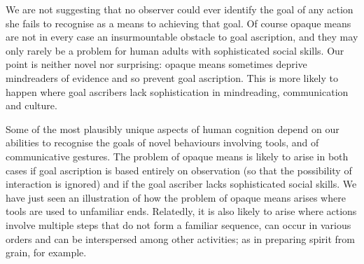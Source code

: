 \documentclass[12pt,\papersize]{extarticle}
\begin{document}
We are not suggesting that no observer could ever identify the goal of any action she fails to recognise as a means to achieving that goal.
Of course opaque means are not in every case an insurmountable obstacle to goal ascription, and
they may only rarely be a problem for human adults with sophisticated social skills.
Our point is neither novel nor surprising:
opaque means sometimes  deprive mindreaders of evidence and so prevent goal ascription.
This is more likely to happen where  goal ascribers lack sophistication in mindreading, communication and culture.

Some of the most plausibly unique aspects of human cognition depend on our abilities to recognise the goals of novel behaviours involving tools, and of communicative gestures.
The problem of opaque means is likely to arise in both cases
if goal ascription is based  entirely on observation 
(so that the possibility of interaction is ignored)
and if the goal ascriber lacks sophisticated social skills.
We have just seen an illustration of how the problem of opaque means arises where tools are used to unfamiliar ends.
Relatedly, it is also likely to arise where actions involve multiple steps that do not form a familiar sequence, can occur in various orders and can be interspersed among other activities;
as in preparing spirit from grain, for example.
\end{document}
